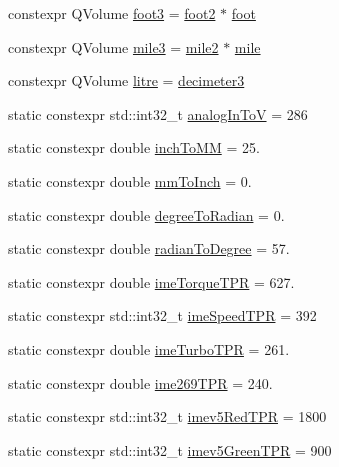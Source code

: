 \begin{DoxyCompactItemize}
\item 
constexpr Q\+Volume \mbox{\hyperlink{namespaceokapi_a287daabad9e16ca8503cbadba7dde50c}{foot3}} = \mbox{\hyperlink{namespaceokapi_a30332192fb24d5d1f81883969ec4878a}{foot2}} $\ast$ \mbox{\hyperlink{namespaceokapi_a76974d5bf7ed9473b2d59153894a8587}{foot}}
\item 
constexpr Q\+Volume \mbox{\hyperlink{namespaceokapi_a01976bc3ef4067a1146756d3853cf137}{mile3}} = \mbox{\hyperlink{namespaceokapi_afa03e58d2dcfa00d61968ef1c183909d}{mile2}} $\ast$ \mbox{\hyperlink{namespaceokapi_adb797d6d549d23e9b2e6c817a07ddfba}{mile}}
\item 
constexpr Q\+Volume \mbox{\hyperlink{namespaceokapi_a877d0e470662f3b0ed2525af2740a761}{litre}} = \mbox{\hyperlink{namespaceokapi_a4f07207ec37be4257d882710d97a3de9}{decimeter3}}
\item 
static constexpr std\+::int32\+\_\+t \mbox{\hyperlink{namespaceokapi_a2a1dadedbf4a0243e7671614e7664eb0}{analog\+In\+ToV}} = 286
\item 
static constexpr double \mbox{\hyperlink{namespaceokapi_a4d717f5c9e81628ef90348718c925d16}{inch\+To\+MM}} = 25.
\item 
static constexpr double \mbox{\hyperlink{namespaceokapi_afecc245ceeabbbfe9f0e6f37fcb2d634}{mm\+To\+Inch}} = 0.
\item 
static constexpr double \mbox{\hyperlink{namespaceokapi_a60e2f3e682c91a331aa5d89d8c0d6507}{degree\+To\+Radian}} = 0.
\item 
static constexpr double \mbox{\hyperlink{namespaceokapi_aa1f1932af0b3ec79171c302a2ed2349e}{radian\+To\+Degree}} = 57.
\item 
static constexpr double \mbox{\hyperlink{namespaceokapi_a84b2d4e8b1e01817a92c15180931b95a}{ime\+Torque\+T\+PR}} = 627.
\item 
static constexpr std\+::int32\+\_\+t \mbox{\hyperlink{namespaceokapi_aed531d8ad5119488b1e6a484ecdc7f4b}{ime\+Speed\+T\+PR}} = 392
\item 
static constexpr double \mbox{\hyperlink{namespaceokapi_afcad34588fd1dcc21821fab917a5a3ac}{ime\+Turbo\+T\+PR}} = 261.
\item 
static constexpr double \mbox{\hyperlink{namespaceokapi_a5be4dc4319f6ab7ea962a35504d7e1b4}{ime269\+T\+PR}} = 240.
\item 
static constexpr std\+::int32\+\_\+t \mbox{\hyperlink{namespaceokapi_a3c1877d878fa2a5f78f1d6edaebb6a7c}{imev5\+Red\+T\+PR}} = 1800
\item 
static constexpr std\+::int32\+\_\+t \mbox{\hyperlink{namespaceokapi_a5263bab3bfecd482a573b6d04fb584ac}{imev5\+Green\+T\+PR}} = 900

\end{DoxyCompactItemize}
